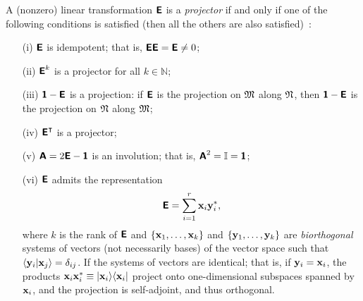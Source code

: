 A (nonzero) linear transformation $\textsf{\textbf{E}}$ is a {\em projector}
if and only if one of
the following conditions is satisfied (then all the others are also satisfied)~\cite{Trenkler1994}:
\begin{itemize}
\item[(i)]
$\textsf{\textbf{E}}$ is idempotent; that is,
$\textsf{\textbf{E}}\textsf{\textbf{E}}=\textsf{\textbf{E}}\neq 0$;

\item[(ii)]
$\textsf{\textbf{E}}^k$ is a projector for all $k \in \mathbb{N}$;

\item[(iii)]
$\textsf{\textbf{1}}-\textsf{\textbf{E}}$ is a projection:
if $\textsf{\textbf{E}}$  is the projection
on ${\frak M}$
along ${\frak N}$,
then
 $\textsf{\textbf{1}}-\textsf{\textbf{E}}$ is the projection
on ${\frak N}$
along ${\frak M}$;

\item[(iv)]
$\textsf{\textbf{E}}^\intercal$ is a projector;

\item[(v)]
$\textsf{\textbf{A}}= 2\textsf{\textbf{E}} - \textsf{\textbf{1}}$ is an involution; that is, $\textsf{\textbf{A}}^2 = \mathbb{I}=\textsf{\textbf{1}}$;

\item[(vi)]
$\textsf{\textbf{E}}$ admits the representation
\begin{equation}
\textsf{\textbf{E}} =\sum_{i=1}^r {\bf x}_i {\bf y}_i^\ast,
\label{2018-mm-ch-fdlvs-dop}
\end{equation}
where $k$ is the rank of $\textsf{\textbf{E}}$ and
$\{ {\bf x}_1, \ldots ,{\bf x}_k\}$
and
$\{ {\bf y}_1, \ldots ,{\bf y}_k\}$
are {\em biorthogonal} systems of vectors (not necessarily bases) of the vector space
such that $\langle {\bf y}_i \vert {\bf x}_j \rangle = \delta_{ij}$.
If the systems of vectors are identical; that is, if ${\bf y}_i={\bf x}_i$,
the products $ {\bf x}_i {\bf x}_i^\ast   \equiv \vert {\bf x}_i\rangle \langle {\bf x}_i \vert$ project onto one-dimensional subspaces
spanned by ${\bf x}_i$, and the projection is self-adjoint, and thus orthogonal.



\end{itemize}

